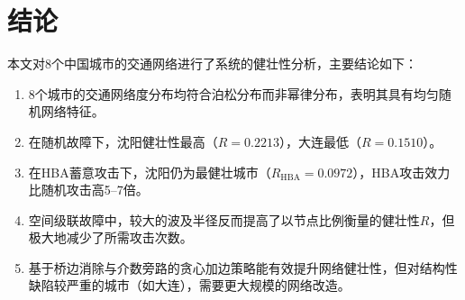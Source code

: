 \documentclass[12pt,a4paper]{article}
\begin{document}
\section{结论}

本文对8个中国城市的交通网络进行了系统的健壮性分析，主要结论如下：

\begin{enumerate}[leftmargin=2em]
    \item 8个城市的交通网络度分布均符合泊松分布而非幂律分布，表明其具有均匀随机网络特征。
    \item 在随机故障下，沈阳健壮性最高（$R=0.2213$），大连最低（$R=0.1510$）。
    \item 在HBA蓄意攻击下，沈阳仍为最健壮城市（$R_{\text{HBA}}=0.0972$），HBA攻击效力比随机攻击高5--7倍。
    \item 空间级联故障中，较大的波及半径反而提高了以节点比例衡量的健壮性$R$，但极大地减少了所需攻击次数。
    \item 基于桥边消除与介数旁路的贪心加边策略能有效提升网络健壮性，但对结构性缺陷较严重的城市（如大连），需要更大规模的网络改造。
\end{enumerate}
\end{document}
